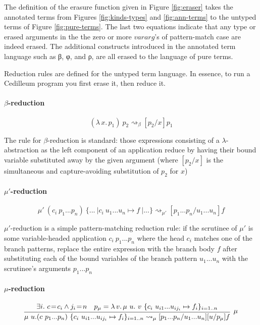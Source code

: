 \documentclass{article}
\newcommand{\absu}[3]{{#1}\, #2.\, #3}
\newcommand{\reduce}{\ensuremath{\rightsquigarrow}}
\begin{document}
The definition of the erasure function given in Figure \ref{fig:eraser} takes
the annotated terms from Figures \ref{fig:kinds-types} and \ref{fig:ann-terms} to
the untyped terms of Figure \ref{fig:pure-terms}. The last two equations
indicate that any type or erased arguments in the the zero or more $vararg$'s of
pattern-match case are indeed erased. The additional constructs introduced in
the annotated term language such as β, φ, and ρ, are all erased to the language
of pure terms.

Reduction rules are defined for the untyped term language. In essence, to run a
Cedilleum program you first erase it, then reduce it.

\paragraph{$\beta$-reduction}
\[ (\absu{\lambda}{x}{p_1})\ p_2 \reduce_{\beta} [p_2/x]p_1 \]

The rule for $\beta$-reduction is standard: those expressions consisting of a
$\lambda$-abstraction as the left component of an application reduce by having
their bound variable substituted away by the given argument (where $[p_2/x]$ is
the simultaneous and capture-avoiding substitution of $p_2$ for $x$)

\paragraph{$\mu'$-reduction}
\[ \mu'\ (c_i\ p_1 ... p_n)\ \{...\ | c_i\ u_1 ... u_n \mapsto f\ |...\}
  \reduce_{\mu'} [p_1 ... p_n/u_1 ... u_n]f\]

$\mu'$-reduction is a simple pattern-matching reduction rule: if the scrutinee
of $\mu'$ is some variable-headed application $c_i\ p_1 ... p_n$ where the head
$c_i$ matches one of the branch patterns, replace the entire expression with the
branch body $f$ after substituting each of the bound variables of the branch
pattern $u_1 ... u_n$ with the scrutinee's arguments $p_1 ... p_n$

\paragraph{$\mu$-reduction}
\[ \infer[\mu]
  { \mu\ u. (c\ p_1 ... p_n)\ \{ c_i\ u_{i1} ... u_{ij_i} \mapsto f_i
    \}_{i=1..n} \reduce_{\mu} [p_1 ... p_n/u_1 ... u_n][u/p_{\mu}]f}
  {
    \exists i.\ c\!=\!c_i \land j_i\!=\!n
    \quad p_{\mu} = \absu{\lambda}{v}{\mu\ u.\ v\ \{c_i\ u_{i1} ... u_{ij_i}
      \mapsto f_i\}_{i=1..n}}
  }
\]
\end{document}

